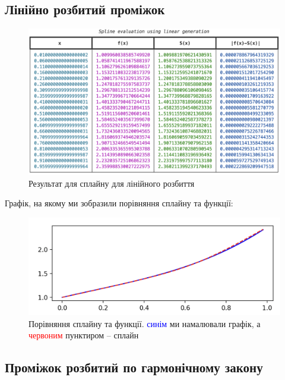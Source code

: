 \documentclass[12pt]{extarticle}
\begin{document}
\subsection{Лінійно розбитий проміжок}
\begin{figure}[H]
    \centering
    \includegraphics[width=\textwidth]{images/lab_2/spline_linear.png}
    \caption{Результат для сплайну для лінійного розбиття}
    \label{fig:1}
\end{figure}

Графік, на якому ми зобразили порівняння сплайну та функції:
\begin{figure}[H]
    \centering
    \includegraphics[width=\textwidth]{images/lab_2/plot.png}
    \caption{Порівняння сплайну та функції. \textcolor{blue}{синім} ми намалювали графік, а \textcolor{red}{червоним} пунктиром -- сплайн}
    \label{fig:2}
\end{figure}

\subsection{Проміжок розбитий по гармонічному закону}
\end{document}

